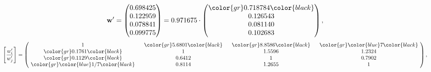 \begin{example}
\begin{equation*}
\mathbf{w}^{\prime} =
\begin{pmatrix}
0.698425\\
0.122959\\
0.078841\\
0.099775
\end{pmatrix} =
0.971675\cdot
\begin{pmatrix}
\color{gr} 0.718784\color{black} \\
0.126543\\
0.081140\\
0.102683
\end{pmatrix},
\end{equation*}
\begin{equation*}
\left[ \frac{{w}^{\prime}_i}{{w}^{\prime}_j} \right] =
\begin{pmatrix}
$\,\,$ 1 $\,\,$ & $\,\,$\color{gr} 5.6801\color{black} $\,\,$ & $\,\,$\color{gr} 8.8586\color{black} $\,\,$ & $\,\,$\color{gr} \color{blue} 7\color{black} $\,\,$ \\
$\,\,$\color{gr} 0.1761\color{black} $\,\,$ & $\,\,$ 1 $\,\,$ & $\,\,$1.5596$\,\,$ & $\,\,$1.2324  $\,\,$ \\
$\,\,$\color{gr} 0.1129\color{black} $\,\,$ & $\,\,$0.6412$\,\,$ & $\,\,$ 1 $\,\,$ & $\,\,$0.7902 $\,\,$ \\
$\,\,$\color{gr} \color{blue}  1/7\color{black} $\,\,$ & $\,\,$0.8114$\,\,$ & $\,\,$1.2655$\,\,$ & $\,\,$ 1  $\,\,$ \\
\end{pmatrix},
\end{equation*}
\end{example}
\newpage
